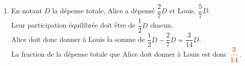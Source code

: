 \documentclass[a4paper,11pt]{article}
\begin{document}
\begin{seanceD}{}
\begin{enumerate}
\item 
 En notant $D$ la dépense totale, Alice a dépensé $\dfrac{2}{7}D$ et Louis, $\dfrac{5}{7}D$.\\
Leur participation équilibrée doit être de $\dfrac{1}{2}D$ chacun.\\
Alice doit donc donner à Louis la somme de $\dfrac{1}{2}D - \dfrac{2}{7}D = \dfrac{3}{14}D$.\\
La fraction de la dépense totale que Alice doit donner à Louis est donc ${\color[HTML]{f15929}\boldsymbol{\dfrac{3}{14}}}$.


\end{enumerate}
\end{seanceD}
\end{document}
